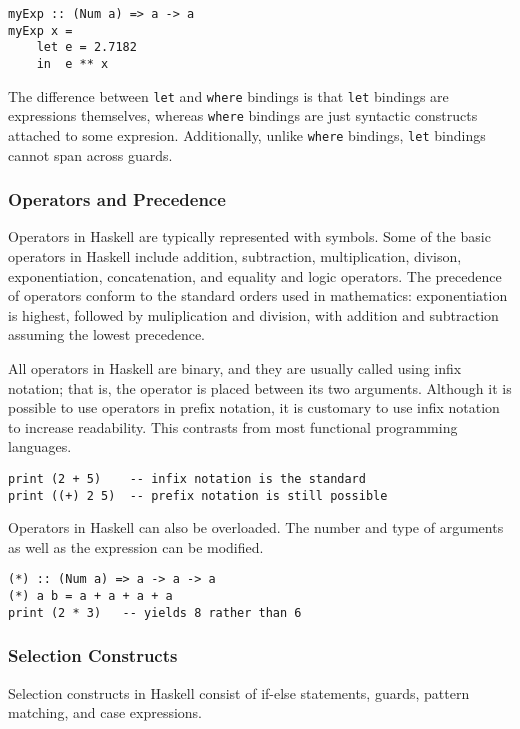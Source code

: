\documentclass[titlepage,12pt]{article}
\begin{document}
\begin{verbatim}
myExp :: (Num a) => a -> a
myExp x =
    let e = 2.7182
    in  e ** x
\end{verbatim}

The difference between \texttt{let} and \texttt{where} bindings is that \texttt{let} bindings are expressions themselves, whereas 
\texttt{where} bindings are just syntactic constructs attached to some expresion. 
Additionally, unlike \texttt{where} bindings, \texttt{let} bindings cannot span across guards.

\subsubsection{Operators and Precedence}

Operators in Haskell are typically represented with symbols. Some of the basic operators in Haskell include addition, 
subtraction, multiplication, divison, exponentiation, concatenation, and equality and logic operators. The 
precedence of operators conform to the standard orders used in mathematics: exponentiation is highest, followed by 
muliplication and division, with addition and subtraction assuming the lowest precedence.  

All operators in Haskell are binary, and they are usually called using infix notation; that is, the operator is 
placed between its two arguments. Although it is possible to use operators in prefix notation, it is customary to use 
infix notation to increase readability. This contrasts from most functional programming languages. 

\begin{verbatim}
print (2 + 5)    -- infix notation is the standard
print ((+) 2 5)  -- prefix notation is still possible
\end{verbatim}

Operators in Haskell can also be overloaded. The number and type of arguments as well as the expression can be modified. 

\begin{verbatim}
(*) :: (Num a) => a -> a -> a
(*) a b = a + a + a + a
print (2 * 3)   -- yields 8 rather than 6
\end{verbatim}

\subsubsection{Selection Constructs}

Selection constructs in Haskell consist of if-else statements, guards, pattern matching, and case expressions. 
\end{document}
